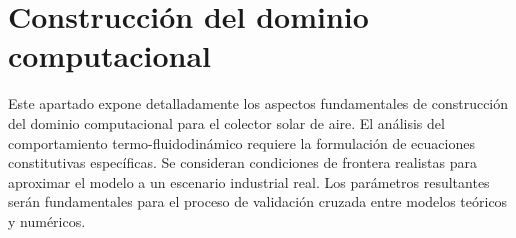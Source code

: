 \section{Construcción del dominio computacional}
\label{sec:cap07_dominio}

Este apartado expone detalladamente los aspectos fundamentales de construcción del dominio computacional para el colector solar de aire.
El análisis del comportamiento termo-fluidodinámico requiere la formulación de ecuaciones constitutivas específicas.
Se consideran condiciones de frontera realistas para aproximar el modelo a un escenario industrial real.
Los parámetros resultantes serán fundamentales para el proceso de validación cruzada entre modelos teóricos y numéricos.
